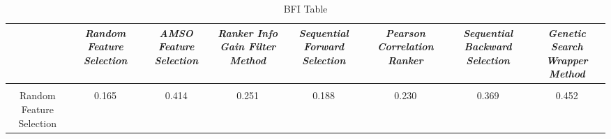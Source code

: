 \begin{table*}[h]
\centering
\caption{BFI Table}
\label{tbl:bfi}\begin{tabular}{|c|c|c|c|c|c|c|c|}
\hline\textit{}&\textit{Random Feature Selection}&\textit{AMSO Feature Selection}&\textit{Ranker Info Gain Filter Method}&\textit{Sequential Forward Selection}&\textit{Pearson Correlation Ranker}&\textit{Sequential Backward Selection}&\textit{Genetic Search Wrapper Method}\\\hline
\\
\hline
Random Feature Selection&0.165&0.414&0.251&0.188&0.230&0.369&0.452\\
\hline
\end{tabular}
\end{table*}